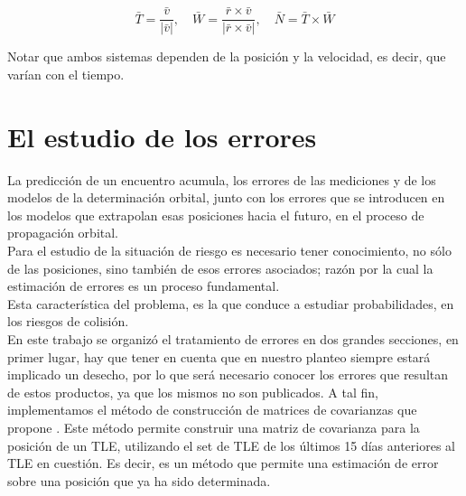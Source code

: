 {\begin{equation}
 \bar{T}=\frac{\bar{v}}{|\bar{v}|}, \quad \bar{W}=\frac{\bar{r}\times\bar{v}}{|\bar{r}\times\bar{v}|}, \quad \bar{N}=\bar{T}\times\bar{W}
\end{equation}



Notar que ambos sistemas dependen de la posici\'on y la velocidad, es decir, que var\'ian con el tiempo.\\





\section{El estudio de los errores}

La predicci\'on de un encuentro acumula, los errores de las mediciones y de los modelos de la  determinaci\'on orbital, junto con los errores que se introducen en los modelos que extrapolan esas posiciones hacia el futuro, en el proceso de propagaci\'on orbital.\\
Para el estudio de la situaci\'on de riesgo es necesario tener conocimiento, no s\'olo de las posiciones, sino tambi\'en de esos errores asociados; raz\'on por la cual la estimaci\'on de errores es un proceso fundamental.\\ 
Esta caracter\'istica del problema, es la que conduce a estudiar probabilidades, en los riesgos de colisi\'on.\\

En este trabajo se organiz\'o el tratamiento de errores en dos grandes secciones, en primer lugar, hay que tener en cuenta que en nuestro planteo siempre estar\'a implicado un desecho, por lo que ser\'a necesario conocer los errores que resultan de estos productos, ya que los mismos no son publicados. A tal fin, implementamos el m\'etodo de construcci\'on de matrices de covarianzas que propone \cite{osweiler}. Este m\'etodo permite construir una matriz de covarianza para la posici\'on de un TLE, utilizando el set de TLE de los \'ultimos 15 d\'ias anteriores al TLE en cuesti\'on. Es decir, es un m\'etodo que permite una estimaci\'on de error sobre una posici\'on que ya ha sido determinada.\\

}
